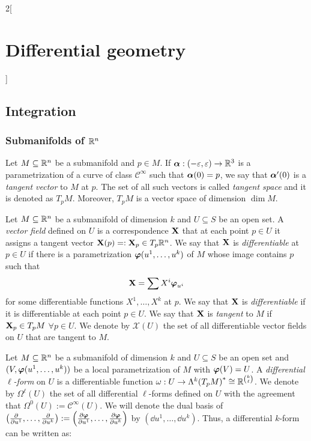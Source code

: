 \documentclass[../../../main.tex]{subfiles}
\begin{document}
\begin{multicols}{2}[\section{Differential geometry}]
  \subsection{Integration}
  \subsubsection{Submanifolds of \texorpdfstring{$\mathbb{R}^n$}{Rn}}
  \begin{definition}
    Let $M\subseteq\mathbb{R}^n$ be a submanifold and $p\in M$. If $\boldsymbol{\mathrm{\alpha}}:(-\varepsilon,\varepsilon)\rightarrow\mathbb{R}^3$ is a parametrization of a curve of class $\mathcal{C}^\infty$ such that $\boldsymbol{\mathrm{\alpha}}(0)=p$, we say that $\boldsymbol{\mathrm{\alpha}}'(0)$ is a \emph{tangent vector} to $M$ at $p$. The set of all such vectors is called \emph{tangent space} and it is denoted as $T_pM$. Moreover, $T_pM$ is a vector space of dimension $\dim M$.
  \end{definition}
  \begin{definition}
    Let $M\subseteq\mathbb{R}^n$ be a submanifold of dimension $k$ and $U\subseteq S$ be an open set. A \emph{vector field} defined on $U$ is a correspondence $\boldsymbol{\mathrm{X}}$ that at each point $p\in U$ it assigns a tangent vector $\boldsymbol{\mathrm{X}}(p)=:\boldsymbol{\mathrm{X}}_p\in T_p\mathbb{R}^n$. We say that $\boldsymbol{\mathrm{X}}$ is \emph{differentiable} at $p\in U$ if there is a parametrization $\boldsymbol{\mathrm{\varphi}}(u^1,\ldots,u^k)$ of $M$ whose image contains $p$ such that $$\boldsymbol{\mathrm{X}}=\sum X^i\boldsymbol{\mathrm{\varphi}}_{u^i}$$ for some differentiable functions $X^1,\ldots,X^k$ at $p$. We say that $\boldsymbol{\mathrm{X}}$ is \emph{differentiable} if it is differentiable at each point $p\in U$. We say that $\boldsymbol{\mathrm{X}}$ is \emph{tangent} to $M$ if $\boldsymbol{\mathrm{X}}_p\in T_pM$ $\forall p\in U$. We denote by $\mathcal{X}(U)$ the set of all differentiable vector fields on $U$ that are tangent to $M$.
  \end{definition}
  \begin{definition}
    Let $M\subseteq\mathbb{R}^n$ be a submanifold of dimension $k$ and $U\subseteq S$ be an open set and $(V,\boldsymbol{\mathrm{\varphi}}(u^1,\ldots,u^k))$ be a local parametrization of $M$ with $\boldsymbol{\mathrm{\varphi}}(V)=U$. A \emph{differential $\ell$-form} on $U$ is a differentiable function $\omega:U\rightarrow\Lambda^k{(T_pM)}^*\cong\mathbb{R}^{\binom{k}{\ell}}$. We denote by $\Omega^\ell(U)$ the set of all differential $\ell$-forms defined on $U$ with the agreement that $\Omega^0(U):=\mathcal{C}^\infty(U)$. We will denote the dual basis of $\left(\pdv{}{u^1},\ldots,\pdv{}{u^k}\right):=\left(\pdv{\boldsymbol{\mathrm{\varphi}}}{u^1},\ldots,\pdv{\boldsymbol{\mathrm{\varphi}}}{u^k}\right)$ by $(\dd{u^1},\ldots,\dd{u^k})$. Thus, a differential $k$-form can be written as:

\end{definition}
\end{multicols}
\end{document}
